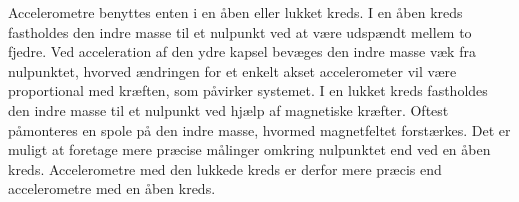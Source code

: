 Accelerometre benyttes enten i en åben eller lukket kreds. I en åben kreds fastholdes den indre masse til et nulpunkt ved at være udspændt mellem to fjedre. Ved acceleration af den ydre kapsel bevæges den indre masse væk fra nulpunktet, hvorved ændringen for et enkelt akset accelerometer vil være proportional med kræften, som påvirker systemet. \newline
I en lukket kreds fastholdes den indre masse til et nulpunkt ved hjælp af magnetiske kræfter. Oftest påmonteres en spole på den indre masse, hvormed magnetfeltet forstærkes. Det er muligt at foretage mere præcise målinger omkring nulpunktet end ved en åben kreds. Accelerometre med den lukkede kreds er derfor mere præcis end accelerometre med en åben kreds.~\citep{Serway2010,TittertonWeston2004,Academic2016d}